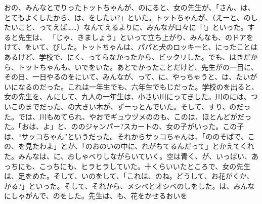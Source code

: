 おの、みんなとでりったトットちゃんが、のにると、女の先生が、「さん、は、とてもよくしたから、は、をしたい?」といた。トットちゃんが、（えーと、のしたいこと、ってえば……）なんてえるよりに、みんなが口々に「!」といった。すると先生は、 「じゃ、きましょう」といって立ち上がり、みんなも、のドアをけて、をいて、びした。トットちゃんは、パパと犬のロッキーと、にったことはあるけど、学校で、にく、ってらなかったから、ビックリした。でも、はきだから、トットちゃんも、いでをいた。あとでかったことだけど、先生がの一目に、その日、一日やるのをにいて、みんなが、って、に、やっちゃうと、は、たいがいになるのだった。これは一年生でも、六年生でもじだった。学校のを出ると、女の先生を、んにして、九人の一年生は、小さい川にってきした。川のには、ついこのまでだった、の大きい木が、ずーっとんでいた。そして、すり、のだった。では、川もめてられ、やおでギュウヅメののも、このは、ほとんどがだった。「おは、よ」と、ののジャンパー?スカートの、女の子がいった。この子は、“サッコちゃん”というだった。それからサッコちゃんは、「ののそばで、この、を見たわよ」とか、「のおのいの中に、れがちてるんだって」とかえてくれた。みんなは、に、おしゃべりしながらいていく。空は青く、が、いっぱい、あっちにも、こっちにも、ヒラヒラしていた。十くらいいたところで、女の先生は、足をめた。そして、いのをして、「これは、のね。どうして、お花がくか、かる?」といった。そして、それから、メシベとオシベのしをした。は、みんなにしゃがんで、のをした。先生は、も、花をかせるおいを